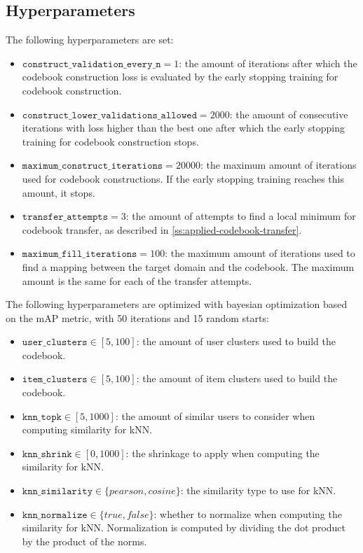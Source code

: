 \subsection{Hyperparameters}
\label{ss:preprocessed-datasets-hyperparameters}

The following hyperparameters are set:
\begin{itemize}
\item $\texttt{construct\_validation\_every\_n} = 1$: the amount of iterations after which the codebook construction loss is evaluated by the early stopping training for codebook construction.
\item $\texttt{construct\_lower\_validations\_allowed} = 2000$: the amount of consecutive iterations with loss higher than the best one after which the early stopping training for codebook construction stops.
\item $\texttt{maximum\_construct\_iterations} = 20000$: the maximum amount of iterations used for codebook constructions. If the early stopping training reaches this amount, it stops.
\item $\texttt{transfer\_attempts} = 3$: the amount of attempts to find a local minimum for codebook transfer, as described in \autoref{ss:applied-codebook-transfer}.
\item $\texttt{maximum\_fill\_iterations} = 100$: the maximum amount of iterations used to find a mapping between the target domain and the codebook. The maximum amount is the same for each of the transfer attempts.
\end{itemize}
The following hyperparameters are optimized with bayesian optimization based on the mAP metric, with 50 iterations and 15 random starts:
\begin{itemize}
\item $\texttt{user\_clusters} \in [5,100]$: the amount of user clusters used to build the codebook.
\item $\texttt{item\_clusters} \in [5,100]$: the amount of item clusters used to build the codebook.
\item $\texttt{knn\_topk} \in [5,1000]$: the amount of similar users to consider when computing similarity for kNN.
\item $\texttt{knn\_shrink} \in [0,1000]$: the shrinkage to apply when computing the similarity for kNN.
\item $\texttt{knn\_similarity} \in \{pearson,cosine\}$: the similarity type to use for kNN.
\item $\texttt{knn\_normalize} \in \{true,false\}$: whether to normalize when computing the similarity for kNN. Normalization is computed by dividing the dot product by the product of the norms.
\end{itemize}


